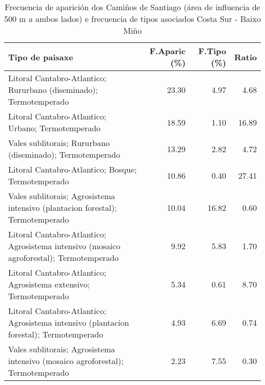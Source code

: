 \begin{table}[p]
\centering
\caption{Frecuencia de aparición dos Camiños de Santiago (área de influencia de 500 m a ambos lados) e frecuencia de tipos asociados Costa Sur - Baixo Miño} 
\label{vcamino3}
\begin{tabular}{lrrr}
  \hline
Tipo de paisaxe & F.Aparic (\%) & F.Tipo (\%) & Ratio \\ 
  \hline
Litoral Cantabro-Atlantico; Rururbano (diseminado); Termotemperado & 23.30 & 4.97 & 4.68 \\ 
  Litoral Cantabro-Atlantico; Urbano; Termotemperado & 18.59 & 1.10 & 16.89 \\ 
  Vales sublitorais; Rururbano (diseminado); Termotemperado & 13.29 & 2.82 & 4.72 \\ 
  Litoral Cantabro-Atlantico; Bosque; Termotemperado & 10.86 & 0.40 & 27.41 \\ 
  Vales sublitorais; Agrosistema intensivo (plantacion forestal); Termotemperado & 10.04 & 16.82 & 0.60 \\ 
  Litoral Cantabro-Atlantico; Agrosistema intensivo (mosaico agroforestal); Termotemperado & 9.92 & 5.83 & 1.70 \\ 
  Litoral Cantabro-Atlantico; Agrosistema extensivo; Termotemperado & 5.34 & 0.61 & 8.70 \\ 
  Litoral Cantabro-Atlantico; Agrosistema intensivo (plantacion forestal); Termotemperado & 4.93 & 6.69 & 0.74 \\ 
  Vales sublitorais; Agrosistema intensivo (mosaico agroforestal); Termotemperado & 2.23 & 7.55 & 0.30 \\ 
   \hline
\end{tabular}
\end{table}
